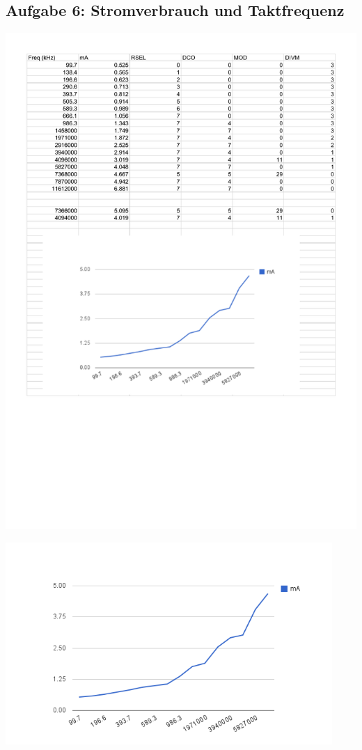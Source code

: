 \subsection*{Aufgabe 6: Stromverbrauch und Taktfrequenz}

\includegraphics[width=\textwidth]{aufgaben/06/DCOCLK.pdf}

\includegraphics[width=0.93\textwidth]{aufgaben/06/chart_1.png}
